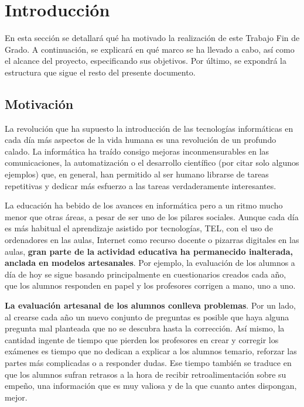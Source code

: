 \chapter{Introducción \label{sec:introduccion}}

En esta sección se detallará qué ha motivado la realización de este Trabajo Fin de Grado. A continuación, se explicará en qué marco se ha llevado a cabo, así como el alcance del proyecto, especificando sus objetivos. Por último, se expondrá  la estructura que sigue el resto del presente documento.

\section{Motivación}


La revolución que ha supuesto la introducción de las tecnologías informáticas en cada día más aspectos de la vida humana es una revolución de un profundo calado. La informática ha traído consigo mejoras inconmensurables en las comunicaciones, la automatización o el desarrollo científico (por citar solo algunos ejemplos) que, en general, han permitido al ser humano librarse de tareas repetitivas y dedicar más esfuerzo a las tareas verdaderamente interesantes.

La educación ha bebido de los avances en informática pero a un ritmo mucho menor que otras áreas, a pesar de ser uno de los pilares sociales. Aunque cada día es más habitual el aprendizaje asistido por tecnologías, \acrshort{TEL}, con el uso de ordenadores en las aulas, Internet como recurso docente o pizarras digitales en las aulas, \textbf{gran parte de la actividad educativa ha permanecido inalterada, anclada en modelos artesanales}. Por ejemplo, la evaluación de los alumnos a día de hoy se sigue basando principalmente en cuestionarios creados cada año, que los alumnos responden en papel y los profesores corrigen a mano, uno a uno.

\textbf{La evaluación artesanal de los alumnos conlleva problemas}. Por un lado, al crearse cada año un nuevo conjunto de preguntas es posible que haya alguna pregunta mal planteada que no se descubra hasta la corrección. Así mismo, la cantidad ingente de tiempo que pierden los profesores en crear y corregir los exámenes es tiempo que no dedican a explicar a los alumnos temario, reforzar las partes más complicadas o a responder dudas. Ese tiempo también se traduce en que los alumnos sufran retrasos a la hora de recibir retroalimentación sobre su empeño, una información que es muy valiosa y de la que cuanto antes dispongan, mejor.


